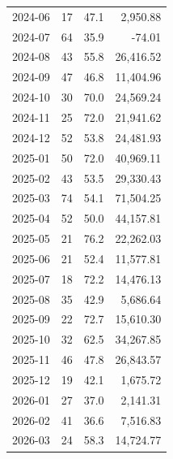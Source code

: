 \documentclass[11pt,a4paper,twoside]{article}
\begin{document}
\begin{center}
\begin{tabular}{>{\color{txtmain}}l rrr}
2024-06 & 17 & 47.1 & \textcolor{wingreen}{2,950.88} \\
2024-07 & 64 & 35.9 & \textcolor{lossred}{-74.01} \\
2024-08 & 43 & 55.8 & \textcolor{wingreen}{26,416.52} \\
2024-09 & 47 & 46.8 & \textcolor{wingreen}{11,404.96} \\
2024-10 & 30 & 70.0 & \textcolor{wingreen}{24,569.24} \\
2024-11 & 25 & 72.0 & \textcolor{wingreen}{21,941.62} \\
2024-12 & 52 & 53.8 & \textcolor{wingreen}{24,481.93} \\
2025-01 & 50 & 72.0 & \textcolor{wingreen}{40,969.11} \\
2025-02 & 43 & 53.5 & \textcolor{wingreen}{29,330.43} \\
2025-03 & 74 & 54.1 & \textcolor{wingreen}{71,504.25} \\
2025-04 & 52 & 50.0 & \textcolor{wingreen}{44,157.81} \\
2025-05 & 21 & 76.2 & \textcolor{wingreen}{22,262.03} \\
2025-06 & 21 & 52.4 & \textcolor{wingreen}{11,577.81} \\
2025-07 & 18 & 72.2 & \textcolor{wingreen}{14,476.13} \\
2025-08 & 35 & 42.9 & \textcolor{wingreen}{5,686.64} \\
2025-09 & 22 & 72.7 & \textcolor{wingreen}{15,610.30} \\
2025-10 & 32 & 62.5 & \textcolor{wingreen}{34,267.85} \\
2025-11 & 46 & 47.8 & \textcolor{wingreen}{26,843.57} \\
2025-12 & 19 & 42.1 & \textcolor{wingreen}{1,675.72} \\
2026-01 & 27 & 37.0 & \textcolor{wingreen}{2,141.31} \\
2026-02 & 41 & 36.6 & \textcolor{wingreen}{7,516.83} \\
2026-03 & 24 & 58.3 & \textcolor{wingreen}{14,724.77} \\
\bottomrule
\end{tabular}
\end{center}
\end{document}
